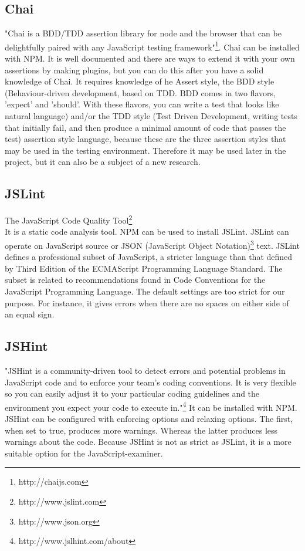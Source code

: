 \documentclass{article}
\begin{document}
\subsection{Chai}
"Chai is a BDD/TDD assertion library for node and the browser that can be delightfully paired with any JavaScript testing framework"\footnote{http://chaijs.com}.
Chai can be installed with NPM.
It is well documented and there are ways to extend it with your own assertions by making plugins,
but you can do this after you have a solid knowledge of Chai.
It requires knowledge of he Assert style, the BDD style (Behaviour-driven development, based on TDD. BDD comes in two flavors, 'expect' and 'should'. With these flavors, you can write a test that looks like natural language) and/or the TDD style (Test Driven Development, writing tests that initially fail, and then produce a minimal amount of code that passes the test) assertion style language, because these are the three assertion styles that may be used in the testing environment.
Therefore it may be used later in the project, but it can also be a subject of a new research.

\subsection{JSLint}
The JavaScript Code Quality Tool\footnote{http://www.jslint.com}\\
It is a static code analysis tool.
NPM can be used to install JSLint.
JSLint can operate on JavaScript source or JSON (JavaScript Object Notation)\footnote {http://www.json.org} text.
JSLint defines a professional subset of JavaScript, a stricter language than that 
defined by Third Edition of the ECMAScript Programming Language Standard.
The subset is related to recommendations found in Code Conventions for the JavaScript Programming Language.
The default settings are too strict for our purpose.
For instance, it gives errors when there are no spaces on either side of an equal sign.

\subsection{JSHint}
"JSHint is a community-driven tool to detect errors and potential problems in JavaScript code and to enforce your team's coding conventions. It is very flexible so you can easily adjust it to your particular coding guidelines and the environment you expect your code to execute in."\footnote{http://www.jslhint.com/about}
It can be installed with NPM.
JSHint can be configured with enforcing options and relaxing options.
The first, when set to true, produces more warnings. Whereas the latter produces less warnings about the code.
Because JSHint is not as strict as JSLint, it is a more suitable option for the JavaScript-examiner.
\end{document}
